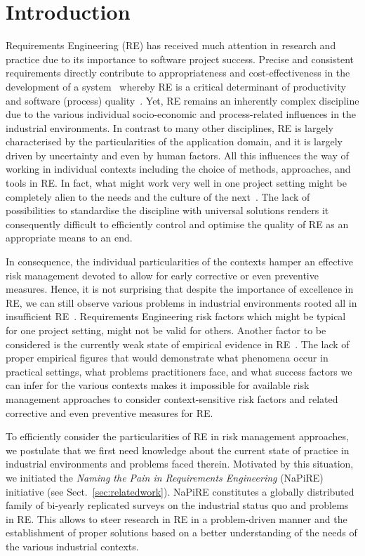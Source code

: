 \documentclass[lnbip]{svmultln}
\begin{document}
\section{Introduction}

Requirements Engineering (RE) has received much attention in research and practice due to its importance to software project success. Precise and consistent requirements directly contribute to appropriateness and cost-effectiveness in the development of a system~\cite{NE00} whereby RE is a critical determinant of productivity and software (process) quality~\cite{DC06}. Yet, RE remains an inherently complex discipline due to the various individual socio-economic and process-related influences in the industrial environments. In contrast to many other disciplines, RE is largely characterised by the particularities of the application domain, and it is largely driven by uncertainty and even by human factors. All this influences the way of working in individual contexts including the choice of methods, approaches, and tools in RE. In fact, what might work very well in one project setting might be completely alien to the needs and the culture of the next~\cite{MW2013}. The lack of possibilities to standardise the discipline with universal solutions renders it consequently difficult to efficiently control and optimise the quality of RE as an appropriate means to an end. 

In consequence, the individual particularities of the contexts hamper an effective risk management devoted to allow for early corrective or even preventive measures. Hence, it is not surprising that despite the importance of excellence in RE, we can still observe various problems in industrial environments rooted all in insufficient RE~\cite{fernandez2015naming, MW+16}. Requirements Engineering risk factors which might be typical for one project setting, might not be valid for others. Another factor to be considered is the currently weak state of empirical evidence in RE~\cite{fernandez2015naming, MW+16}. The lack of proper empirical figures that would demonstrate what phenomena occur in practical settings, what problems practitioners face, and what success factors we can infer for the various contexts makes it impossible for available risk management approaches to consider context-sensitive risk factors and related corrective and even preventive measures for RE.

To efficiently consider the particularities of RE in risk management approaches, we postulate that we first need knowledge about the current state of practice in industrial environments and problems faced therein. Motivated by this situation, we initiated the \emph{Naming the Pain in Requirements Engineering} (NaPiRE) initiative (see Sect.~\ref{sec:relatedwork}). NaPiRE constitutes a globally distributed family of bi-yearly replicated surveys on the industrial status quo and problems in RE. This allows to steer research in RE in a problem-driven manner and the establishment of proper solutions based on a better understanding of the needs of the various industrial contexts.
\end{document}

